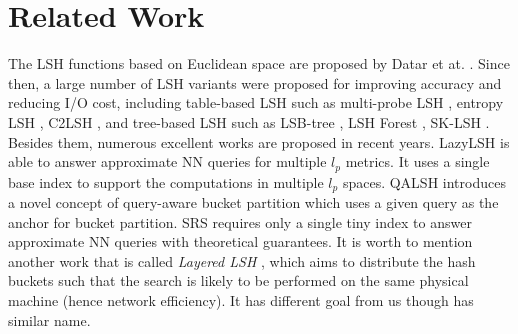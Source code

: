 \section{Related Work}
\label{sec:related}

 The LSH functions based on Euclidean space are proposed by Datar et at. \cite{datar}. Since then, a large number of LSH variants were proposed for improving accuracy and reducing I/O cost, including table-based LSH such as multi-probe LSH \cite{mplsh}, entropy LSH \cite{Panigrahy:2006:EBN:1109557.1109688}, C2LSH \cite{c2lsh}, and tree-based LSH such as LSB-tree \cite{lsb}, LSH Forest \cite{Bawa:2005:LFS:1060745.1060840}, SK-LSH \cite{sklsh}. Besides them, numerous excellent works are proposed in recent years. LazyLSH \cite{Zheng:2016:LAN:2882903.2882930} is able to answer approximate NN queries for multiple $l_p$ metrics. It uses a single base index to support the computations in multiple $l_p$ spaces. QALSH \cite{Huang:2015:QLH:2850469.2850470} introduces a novel concept of query-aware bucket partition which uses a given query as the anchor for bucket partition. SRS \cite{srs} requires only a single tiny index to answer approximate NN queries with theoretical guarantees. It is worth to mention another work that is called \emph{Layered LSH} \cite{distlsh}, which aims to distribute the hash buckets such that the search is likely to be performed on the same physical machine (hence network efficiency). It has different goal from us though has similar name.



